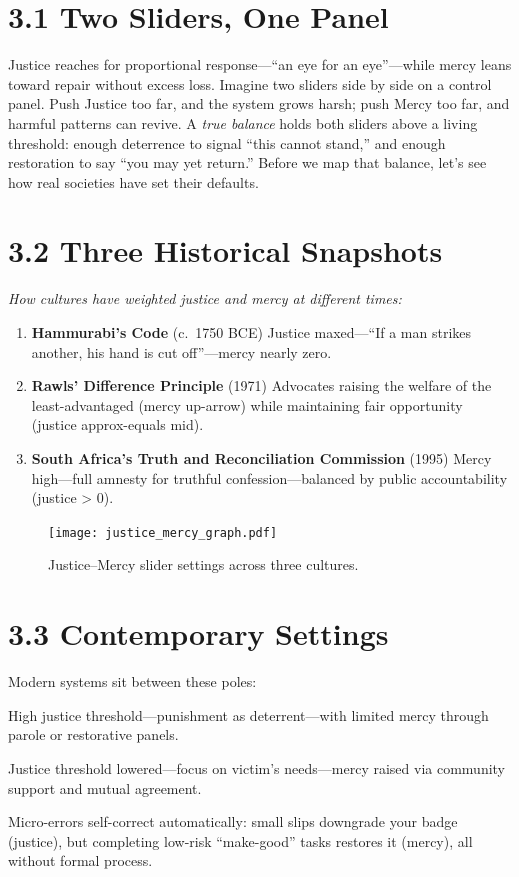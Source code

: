 \documentclass{book}       %
\begin{document}
\section*{3.1  Two Sliders, One Panel}
Justice reaches for proportional response—“an eye for an eye”—while mercy leans toward repair without excess loss.  Imagine two sliders side by side on a control panel.  Push Justice too far, and the system grows harsh; push Mercy too far, and harmful patterns can revive.  A \emph{true balance} holds both sliders above a living threshold: enough deterrence to signal “this cannot stand,” and enough restoration to say “you may yet return.”  
Before we map that balance, let’s see how real societies have set their defaults.

\section*{3.2  Three Historical Snapshots}
\textit{How cultures have weighted justice and mercy at different times:}
\begin{enumerate}[label=(\alph*)]
  \item \textbf{Hammurabi’s Code} (c.\ 1750 BCE)  
    \; Justice maxed—“If a man strikes another, his hand is cut off”—mercy nearly zero.  
  \item \textbf{Rawls’ Difference Principle} (1971)  
    \; Advocates raising the welfare of the least-advantaged (mercy up-arrow) while maintaining fair opportunity (justice approx-equals mid).
  \item \textbf{South Africa’s Truth and Reconciliation Commission} (1995)  
    \; Mercy high—full amnesty for truthful confession—balanced by public accountability (justice > 0).  
\end{enumerate}

\begin{figure}
  \texttt{[image: justice\_mercy\_graph.pdf]}
  \caption{Justice–Mercy slider settings across three cultures.}
\end{figure}

\section*{3.3  Contemporary Settings}
Modern systems sit between these poles:
\begin{description}[noitemsep]
  \item[\textbf{Criminal courts}]  
    High justice threshold—punishment as deterrent—with limited mercy through parole or restorative panels.
  \item[\textbf{Restorative circles}]  
    Justice threshold lowered—focus on victim’s needs—mercy raised via community support and mutual agreement.
  \item[\textbf{Momentum-badge lattice}]  
    Micro-errors self-correct automatically: small slips downgrade your badge (justice), but completing low-risk “make-good” tasks restores it (mercy), all without formal process.
\end{description}
\end{document}
